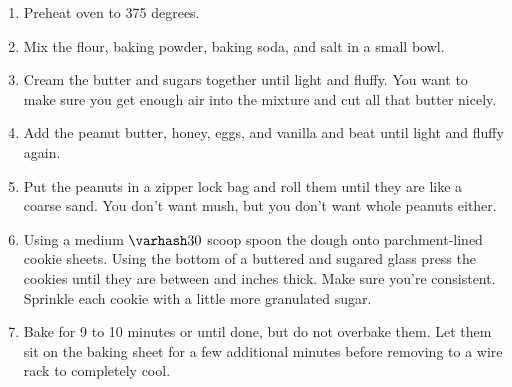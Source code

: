 \documentclass{article}
\begin{document}
\begin{enumerate}
      \item Preheat oven to 375 degrees.
      \item Mix the flour, baking powder, baking soda, and salt in a small bowl.
      \item Cream the butter and sugars together until light and fluffy. You want to make sure you get
            enough air into the mixture and cut all that butter nicely.
      \item Add the peanut butter, honey, eggs, and vanilla and beat until light and fluffy again.
      \item Put the peanuts in a zipper lock bag and roll them until they are like a coarse sand. You
            don't want mush, but you don't want whole peanuts either.
      \item Using a medium $\varhash 30$ scoop spoon the dough onto parchment-lined cookie sheets. Using
            the bottom of a buttered and sugared glass press the cookies until they are between 
            and  inches thick. Make sure you're consistent. Sprinkle each cookie with a little
            more granulated sugar.
      \item Bake for 9 to 10 minutes or until done, but do not overbake them. Let them sit on the baking
            sheet for a few additional minutes before removing to a wire rack to completely cool.
\end{enumerate}


\end{document}
